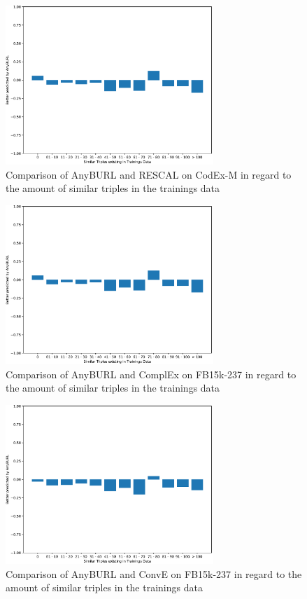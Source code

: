 \begin{figure}[H]
\centering
\includegraphics[width=0.7\textwidth]{images/similar_triples_steps_anyburl_rescal_codex.PNG}
\caption{Comparison of AnyBURL and RESCAL on CodEx-M in regard to the amount of similar triples in the trainings data}
\label{fig:similar_triples_steps_anyburl_rescal_codex}
\end{figure}

\begin{figure}[H]
\centering
\includegraphics[width=0.7\textwidth]{images/similar_triples_steps_anyburl_complex_fb15k.PNG}
\caption{Comparison of AnyBURL and ComplEx on FB15k-237 in regard to the amount of similar triples in the trainings data}
\label{fig:similar_triples_steps_anyburl_complex_fb15k}
\end{figure}

\begin{figure}[H]
\centering
\includegraphics[width=0.7\textwidth]{images/similar_triples_steps_anyburl_conve_codex.PNG}
\caption{Comparison of AnyBURL and ConvE on FB15k-237 in regard to the amount of similar triples in the trainings data}
\label{fig:similar_triples_steps_anyburl_conve_fb15k}
\end{figure}

